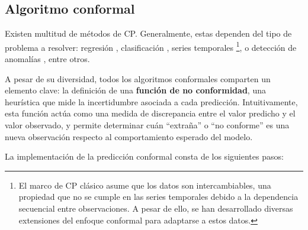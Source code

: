 
\subsection{Algoritmo conformal}

Existen multitud de métodos de CP. Generalmente, estas dependen del tipo de problema a resolver: 
regresión \cite{papadopoulos2002, romano2019, bethell2024}, clasificación 
\cite{sadinle2019, romano2020, angelopoulos2020}, series temporales \cite{xu2021, zaffran2022, 
stankeviciute2021}%
\footnote{
    El marco de CP clásico asume que los datos son intercambiables, una propiedad que no se cumple en las 
    series temporales debido a la dependencia secuencial entre observaciones. A pesar de ello, se han 
    desarrollado diversas extensiones del enfoque conformal para adaptarse a estos datos.
},
o detección de anomalías \cite{laxhammar2015}, entre otros. 

A pesar de su diversidad, todos los algoritmos conformales comparten un elemento clave: la definición de una 
\textbf{función de no conformidad}, una heurística que mide la incertidumbre asociada a cada predicción. 
Intuitivamente, esta función actúa como una medida de discrepancia entre el valor predicho y el valor 
observado, y permite determinar cuán ``extraña'' o ``no conforme'' es una nueva observación respecto al 
comportamiento esperado del modelo.

La implementación de la predicción conformal consta de los siguientes pasos:

